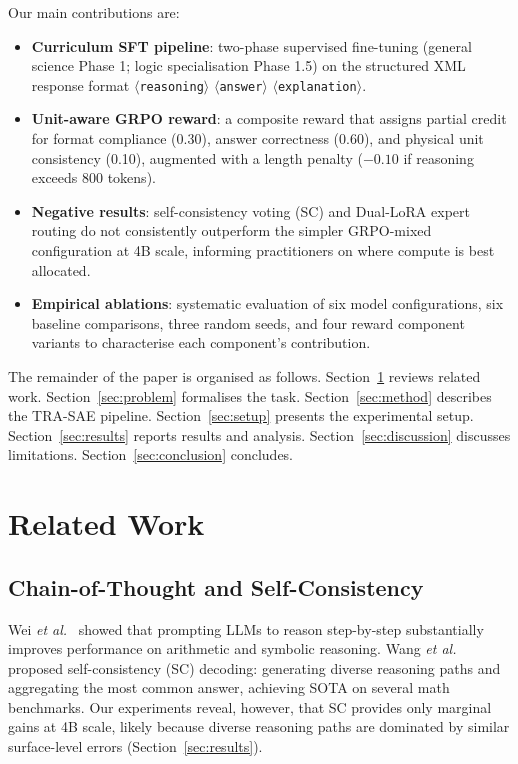 \documentclass{ieeeaccess}
\newcommand{\modelname}{\textsc{TRA-SAE}}
\begin{document}
Our main contributions are:
\begin{itemize}
  \item \textbf{Curriculum SFT pipeline}: two-phase supervised fine-tuning
        (general science Phase 1; logic specialisation Phase 1.5) on the
        structured XML response format $\langle$\texttt{reasoning}$\rangle$
        $\langle$\texttt{answer}$\rangle$ $\langle$\texttt{explanation}$\rangle$.
  \item \textbf{Unit-aware GRPO reward}: a composite reward that assigns
        partial credit for format compliance (0.30), answer correctness (0.60),
        and physical unit consistency (0.10), augmented with a length penalty
        ($-0.10$ if reasoning exceeds 800 tokens).
  \item \textbf{Negative results}: self-consistency voting (SC) and
        Dual-LoRA expert routing do not consistently outperform
        the simpler GRPO-mixed configuration at 4B scale, informing
        practitioners on where compute is best allocated.
  \item \textbf{Empirical ablations}: systematic evaluation of six model
        configurations, six baseline comparisons, three random seeds, and
        four reward component variants to characterise each component's
        contribution.
\end{itemize}

The remainder of the paper is organised as follows.
Section~\ref{sec:related} reviews related work.
Section~\ref{sec:problem} formalises the task.
Section~\ref{sec:method} describes the \modelname{} pipeline.
Section~\ref{sec:setup} presents the experimental setup.
Section~\ref{sec:results} reports results and analysis.
Section~\ref{sec:discussion} discusses limitations.
Section~\ref{sec:conclusion} concludes.

\section{Related Work}
\label{sec:related}

\subsection{Chain-of-Thought and Self-Consistency}

Wei \emph{et al.}~\cite{Wei2022} showed that prompting LLMs to reason
step-by-step substantially improves performance on arithmetic and symbolic
reasoning.
Wang \emph{et al.}~\cite{Wang2023sc} proposed self-consistency (SC) decoding:
generating diverse reasoning paths and aggregating the most common answer,
achieving SOTA on several math benchmarks.
Our experiments reveal, however, that SC provides only marginal gains
at 4B scale, likely because diverse reasoning paths are dominated by similar
surface-level errors (Section~\ref{sec:results}).
\end{document}
